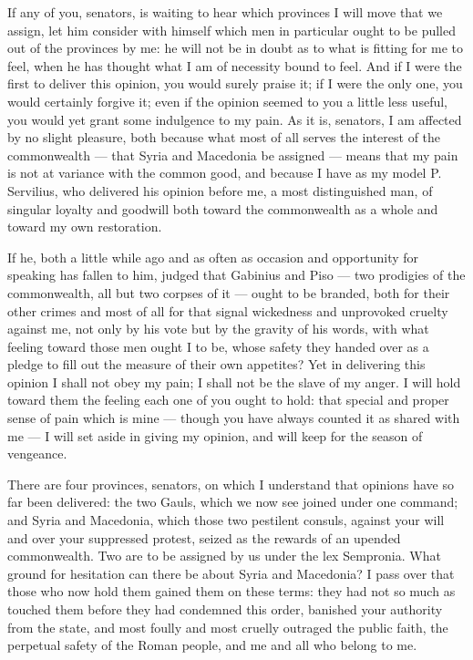 
 If any of you, senators, is waiting to hear which provinces I will move that we assign, let him consider with himself which men in particular ought to be pulled out of the provinces by me: he will not be in doubt as to what is fitting for me to feel, when he has thought what I am of necessity bound to feel. And if I were the first to deliver this opinion, you would surely praise it; if I were the only one, you would certainly forgive it; even if the opinion seemed to you a little less useful, you would yet grant some indulgence to my pain. As it is, senators, I am affected by no slight pleasure, both because what most of all serves the interest of the commonwealth --- that Syria and Macedonia be assigned --- means that my pain is not at variance with the common good, and because I have as my model P. Servilius, who delivered his opinion before me, a most distinguished man, of singular loyalty and goodwill both toward the commonwealth as a whole and toward my own restoration.

 If he, both a little while ago and as often as occasion and opportunity for speaking has fallen to him, judged that Gabinius and Piso --- two prodigies of the commonwealth, all but two corpses of it --- ought to be branded, both for their other crimes and most of all for that signal wickedness and unprovoked cruelty against me, not only by his vote but by the gravity of his words, with what feeling toward those men ought I to be, whose safety they handed over as a pledge to fill out the measure of their own appetites? Yet in delivering this opinion I shall not obey my pain; I shall not be the slave of my anger. I will hold toward them the feeling each one of you ought to hold: that special and proper sense of pain which is mine --- though you have always counted it as shared with me --- I will set aside in giving my opinion, and will keep for the season of vengeance.

 There are four provinces, senators, on which I understand that opinions have so far been delivered: the two Gauls, which we now see joined under one command; and Syria and Macedonia, which those two pestilent consuls, against your will and over your suppressed protest, seized as the rewards of an upended commonwealth. Two are to be assigned by us under the lex Sempronia. What ground for hesitation can there be about Syria and Macedonia? I pass over that those who now hold them gained them on these terms: they had not so much as touched them before they had condemned this order, banished your authority from the state, and most foully and most cruelly outraged the public faith, the perpetual safety of the Roman people, and me and all who belong to me.

